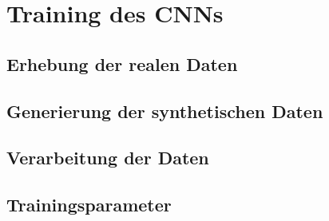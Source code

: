 
\section{Training des CNNs}
\subsection{Erhebung der realen Daten}
\subsection{Generierung der synthetischen Daten}
\subsection{Verarbeitung der Daten}

\subsection{Trainingsparameter}
